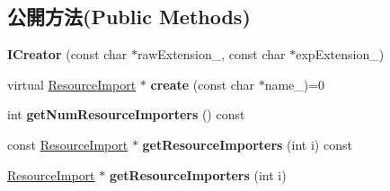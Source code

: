 \subsection*{公開方法(Public Methods)}
\begin{DoxyCompactItemize}
\item 
{\bfseries I\+Creator} (const char $\ast$raw\+Extension\+\_\+, const char $\ast$exp\+Extension\+\_\+)\hypertarget{class_magnum_1_1_resource_import_1_1_i_creator_a2ddaf334082ce35802483c9435e52c7c}{}\label{class_magnum_1_1_resource_import_1_1_i_creator_a2ddaf334082ce35802483c9435e52c7c}

\item 
virtual \hyperlink{class_magnum_1_1_resource_import}{Resource\+Import} $\ast$ {\bfseries create} (const char $\ast$name\+\_\+)=0\hypertarget{class_magnum_1_1_resource_import_1_1_i_creator_a2bd9c93b0f056aad8bee9ae4c096e6f5}{}\label{class_magnum_1_1_resource_import_1_1_i_creator_a2bd9c93b0f056aad8bee9ae4c096e6f5}

\item 
int {\bfseries get\+Num\+Resource\+Importers} () const \hypertarget{class_magnum_1_1_resource_import_1_1_i_creator_abbe2a2dc74645a1cbf6fc22525278476}{}\label{class_magnum_1_1_resource_import_1_1_i_creator_abbe2a2dc74645a1cbf6fc22525278476}

\item 
const \hyperlink{class_magnum_1_1_resource_import}{Resource\+Import} $\ast$ {\bfseries get\+Resource\+Importers} (int i) const \hypertarget{class_magnum_1_1_resource_import_1_1_i_creator_a08495a2123c94bc5dbcadf3154b01c4e}{}\label{class_magnum_1_1_resource_import_1_1_i_creator_a08495a2123c94bc5dbcadf3154b01c4e}

\item 
\hyperlink{class_magnum_1_1_resource_import}{Resource\+Import} $\ast$ {\bfseries get\+Resource\+Importers} (int i)\hypertarget{class_magnum_1_1_resource_import_1_1_i_creator_ab83009f25d489718ce7bce7dba22e691}{}\label{class_magnum_1_1_resource_import_1_1_i_creator_ab83009f25d489718ce7bce7dba22e691}

\end{DoxyCompactItemize}
